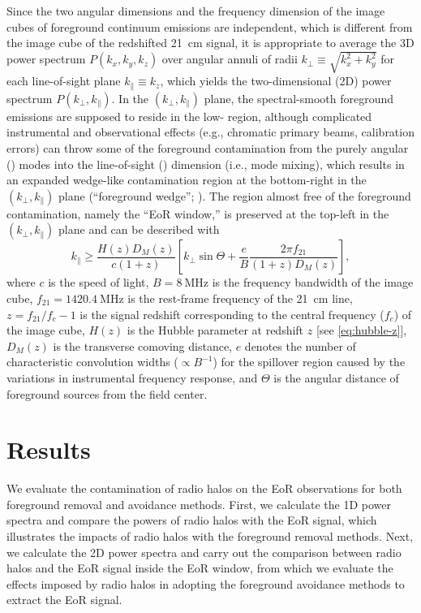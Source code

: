 \documentclass[modern]{aastex62}
\newcommand{\klos}{\text{$k_{\parallel}$}}
\newcommand{\kperp}{\text{$k_{\bot}$}}
\begin{document}
Since the two angular dimensions and the frequency dimension of the image
cubes of foreground continuum emissions are independent, which is
different from the image cube of the redshifted 21~cm signal, it is
appropriate to average the 3D power spectrum $P(k_x, k_y, k_z)$
over angular annuli of radii $\kperp \equiv \sqrt{k_x^2 + k_y^2}$
for each line-of-sight plane $\klos \equiv k_z$, which yields the
two-dimensional (2D) power spectrum $P(\kperp, \klos)$.
In the $(\kperp, \klos)$ plane, the spectral-smooth foreground emissions
are supposed to reside in the low-\klos{} region, although complicated
instrumental and observational effects (e.g., chromatic primary beams,
calibration errors) can throw some of the foreground contamination from
the purely angular (\kperp) modes into the line-of-sight (\klos)
dimension (i.e., mode mixing), which results in an expanded wedge-like
contamination region at the bottom-right in the $(\kperp, \klos)$ plane
(\enquote{foreground wedge}; \citealt{datta2010,morales2012,liu2014}).
The region almost free of the foreground contamination, namely the
\enquote{EoR window,} is preserved at the top-left in the
$(\kperp, \klos)$ plane and can be described with \citep{thyagarajan2013}
\begin{equation}
  \label{eq:eor-window}
  \klos \geq \frac{H(z) D_{\!M}(z)}{c (1+z)} \left[
    \kperp \sin\Theta +
    \frac{e}{B} \frac{2\pi f_{21}}{(1+z) D_{\!M}(z)} \right],
\end{equation}
where
$c$ is the speed of light,
$B = \SI{8}{\MHz}$ is the frequency bandwidth of the image cube,
$f_{21} = \SI{1420.4}{\MHz}$ is the rest-frame frequency of the 21~cm line,
$z = f_{21}/f_c - 1$ is the signal redshift corresponding to the central
frequency ($f_c$) of the image cube,
$H(z)$ is the Hubble parameter at redshift $z$ [see \autoref{eq:hubble-z}],
$D_{\!M}(z)$ is the transverse comoving distance,
$e$ denotes the number of characteristic convolution widths
($\propto B^{-1}$) for the spillover region caused by the variations in
instrumental frequency response,
and $\Theta$ is the angular distance of foreground sources from the
field center.


\section{Results}
\label{sec:results}

We evaluate the contamination of radio halos on the EoR observations for
both foreground removal and avoidance methods.
First, we calculate the 1D power spectra and compare the powers of
radio halos with the EoR signal, which illustrates the impacts of radio
halos with the foreground removal methods.
Next, we calculate the 2D power spectra and carry out the comparison
between radio halos and the EoR signal inside the EoR window, from
which we evaluate the effects imposed by radio halos in adopting the
foreground avoidance methods to extract the EoR signal.
\end{document}
